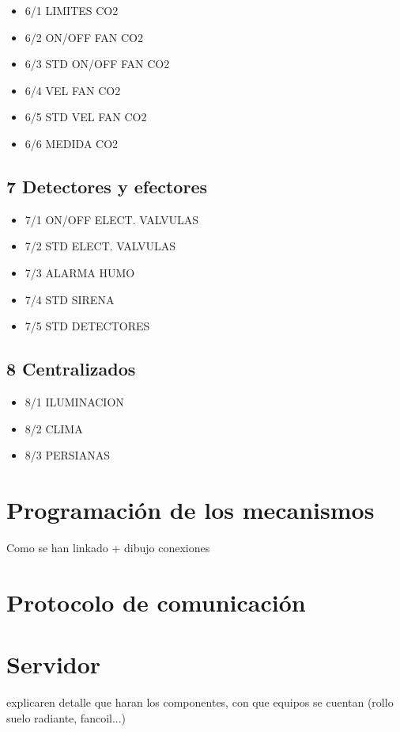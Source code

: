 \begin{itemize}
\item{6/1 LIMITES CO2}
\item{6/2 ON/OFF FAN CO2}
\item{6/3 STD ON/OFF FAN CO2}
\item{6/4 VEL FAN CO2}
\item{6/5 STD VEL FAN CO2}
\item{6/6 MEDIDA CO2}
\end{itemize} 

\subsection{7 Detectores y efectores}

\begin{itemize}
\item{7/1 ON/OFF ELECT. VALVULAS}
\item{7/2 STD ELECT. VALVULAS}
\item{7/3 ALARMA HUMO}
\item{7/4 STD SIRENA}
\item{7/5 STD DETECTORES}
\end{itemize} 

\subsection{8 Centralizados}

\begin{itemize}
\item{8/1 ILUMINACION}
\item{8/2 CLIMA}
\item{8/3 PERSIANAS}
\end{itemize} 

\section{Programación de los mecanismos}

Como se han linkado + dibujo conexiones

\section{Protocolo de comunicación}




\section{Servidor}

explicaren detalle que haran los componentes, con que equipos se cuentan (rollo suelo radiante, fancoil...)